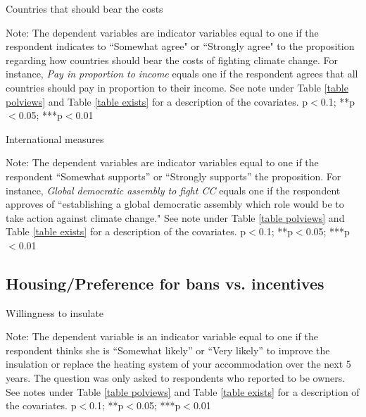 \documentclass{article}
\begin{document}
\begin{landscape}
	\begin{table}[h!]
	\caption{Countries that should bear the costs}
	\begin{center}
		\scalebox{0.6}{}
	\end{center}
	{\footnotesize Note: The dependent variables are indicator variables equal to one if the respondent indicates to ``Somewhat agree" or ``Strongly agree" to the proposition regarding how countries should bear the costs of fighting climate change. For instance, \textit{Pay in proportion to income} equals one if the respondent agrees that all countries should pay in proportion to their income. See note under Table \ref{table polviews} and Table \ref{table exists} for a description of the covariates.
	\newline *p$<$0.1; **p$<$0.05; ***p$<$0.01}
\end{table}	
\end{landscape}

\begin{landscape}
	\begin{table}[h!]
	\caption{International measures}
	\begin{center}
		\scalebox{0.6}{}
	\end{center}
	{\footnotesize Note: The dependent variables are indicator variables equal to one if the respondent ``Somewhat supports'' or ``Strongly supports'' the proposition. For instance, \textit{Global democratic assembly to fight CC} equals one if the respondent approves of ``establishing a global democratic assembly which role would be to take action against climate change." See note under Table \ref{table polviews} and Table \ref{table exists} for a description of the covariates.
	\newline *p$<$0.1; **p$<$0.05; ***p$<$0.01}
\end{table}	
\end{landscape}



\clearpage
\subsection{Housing/Preference for bans vs. incentives}



\begin{table}[h!]
	\caption{Willingness to insulate}
	\begin{center}
		\scalebox{0.7}{}
	\end{center}
	{\footnotesize Note: The dependent variable is an indicator variable equal to one if the respondent thinks she is ``Somewhat likely'' or ``Very likely'' to improve the insulation or replace the heating system of your accommodation over the next 5 years. The question was only asked to respondents who reported to be owners. See notes under Table \ref{table polviews} and Table \ref{table exists} for a description of the covariates.
	\newline *p$<$0.1; **p$<$0.05; ***p$<$0.01}
\end{table}	
\end{document}
